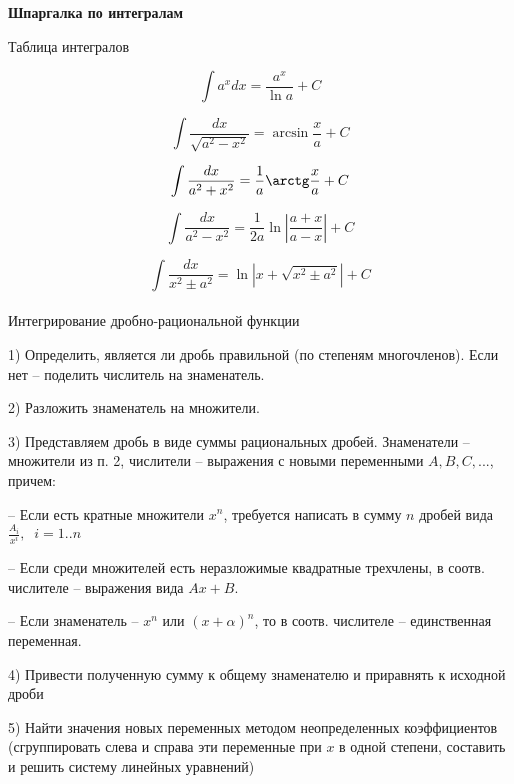 \documentclass{article}
\begin{document}
    \huge{\textbf{Шпаргалка по интегралам}}\\\small
    
    \large{Таблица интегралов}\small
    
    \begin{equation}
        \int a^x dx = \frac{a^x}{\ln a} + C
    \end{equation}
    
    \begin{equation}
        \int \frac{dx}{\sqrt{a^2-x^2}} = \arcsin\frac{x}{a} + C
    \end{equation}
    
    \begin{equation}
        \int \frac{dx}{a^2 + x^2} = \frac{1}{a}\arctg\frac{x}{a} + C
    \end{equation}
    
    \begin{equation}
        \int \frac{dx}{a^2 - x^2} = \frac{1}{2a}\ln |\frac{a+x}{a-x}| + C
    \end{equation}
    
    \begin{equation}
        \int \frac{dx}{x^2\pm a^2} = \ln |x+\sqrt{x^2\pm a^2}| + C
    \end{equation}\\
    
    \large{Интегрирование дробно-рациональной функции}\small
    
    1) Определить, является ли дробь правильной (по степеням многочленов). Если нет -- поделить числитель на знаменатель.
    
    2) Разложить знаменатель на множители.
    
    3) Представляем дробь в виде суммы рациональных дробей. Знаменатели -- множители из п. 2, числители -- выражения с новыми переменными $A, B, C, ...$, причем:
    
    -- Если есть кратные множители $x^n$, требуется написать в сумму $n$ дробей вида $\frac{A_i}{x^i},\;\;i=1..n$

    -- Если среди множителей есть неразложимые квадратные трехчлены, в соотв. числителе -- выражения вида $Ax+B$.
    
    -- Если знаменатель -- $x^n$ или $(x+\alpha)^n$, то в соотв. числителе -- единственная переменная.

    4) Привести полученную сумму к общему знаменателю и приравнять к исходной дроби
    
    5) Найти значения новых переменных методом неопределенных коэффициентов (сгруппировать слева и справа эти переменные при $x$ в одной степени, составить и решить систему линейных уравнений)
\end{document}
